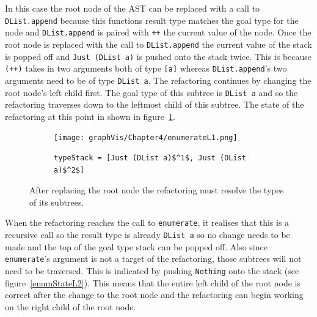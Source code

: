 In this case the root node of the AST can be replaced with a call to \texttt{DList.append} because this functions result type matches the goal type for the node and \texttt{DList.append} is paired with \texttt{++} the current value of the node. Once the root node is replaced with the call to \texttt{DList.append} the current value of the stack is popped off and \texttt{Just (DList a)} is pushed onto the stack twice. This is because \texttt{(++)} takes in two arguments both of type \texttt{[a]} whereas \texttt{DList.append}'s two arguments need to be of type \texttt{DList a}. The refactoring continues by changing the root node's left child first. The goal type of this subtree is \texttt{DList a} and so the refactoring traverses down to the leftmost child of this subtree. The state of the refactoring at this point in shown in figure~\ref{enumStateL1}.

\begin{figure}[t]
	\begin{subfigure}{\linewidth}
		\texttt{[image: graphVis/Chapter4/enumerateL1.png]}
	\end{subfigure}\par\medskip

	\begin{subfigure}{\linewidth}
		\begin{lstlisting}[mathescape]
			typeStack = [Just (DList a)$^1$, Just (DList a)$^2$]
		\end{lstlisting}
	\end{subfigure}\par\medskip
\caption{After replacing the root node the refactoring must resolve the types of its subtrees.}
\label{enumStateL1}
\end{figure} 

When the refactoring reaches the call to \texttt{enumerate}, it realises that this is a recursive call so the result type is already \texttt{DList a} so no change needs to be made and the top of the goal type stack can be popped off. Also since \texttt{enumerate}'s argument is not a target of the refactoring, those subtrees will not need to be traversed. This is indicated by pushing \texttt{Nothing} onto the stack (see figure~\ref{enumStateL2}). This means that the entire left child of the root node is correct after the change to the root node and the refactoring can begin working on the right child of the root node.

